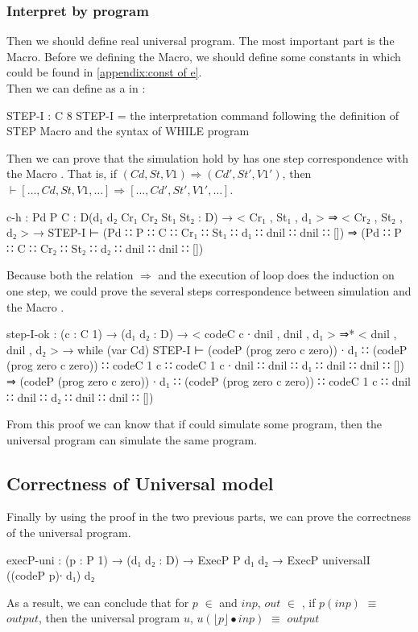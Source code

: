 \subsubsection{Interpret by \WHILE program}
Then we should define real universal \WHILE program.
The most important part is the  Macro.
Before we defining the Macro, we should define some constants in  which could be found in \ref{appendix:const of e}.\\
Then we can define  as a  in \Agda:
\begin{code}
STEP-I : C 8
STEP-I =  the interpretation command
	  following the definition of STEP Macro
	  and the syntax of WHILE program
\end{code}
Then we can prove that the simulation hold by \Agda has one step correspondence with the Macro .
That is, if $(Cd,St,V1)\Rightarrow(Cd',St',V1')$, then  $\vdash [\dots, Cd, St, V1, \dots] \Rightarrow [\dots, Cd', St', V1', \dots]$.
\begin{code}
  c-h : {Pd P C : D}(d₁ d₂ Cr₁ Cr₂ St₁ St₂ : D) 
        → < Cr₁ , St₁ , d₁ > ⇒ < Cr₂ , St₂ , d₂ >
        → STEP-I ⊢ (Pd ∷ P ∷ C ∷ Cr₁ ∷ St₁ ∷ d₁ ∷ dnil ∷ dnil ∷ [])
                 ⇒ (Pd ∷ P ∷ C ∷ Cr₂ ∷ St₂ ∷ d₂ ∷ dnil ∷ dnil ∷ [])
\end{code}
Because both the relation $\Rightarrow$ and the execution of  loop does the induction on one step, we could prove the several steps correspondence between \Agda simulation and the Macro .
\begin{code}[fontsize=\footnotesize]
step-I-ok : (c : C 1) → (d₁ d₂ : D) 
            → < codeC c ∙ dnil , dnil , d₁ > ⇒* < dnil , dnil , d₂ >
            → while (var Cd) STEP-I ⊢ (codeP (prog zero c zero)) ∙ d₁ ∷
                                      (codeP (prog zero c zero)) ∷
                                      codeC {1} c ∷ codeC {1} c ∙ dnil  ∷
                                      dnil ∷ d₁ ∷ dnil ∷ dnil ∷ [])
                                    ⇒ (codeP (prog zero c zero)) ∙ d₁ ∷
                                      (codeP (prog zero c zero)) ∷
                                      codeC {1} c ∷ dnil ∷ dnil ∷
                                      d₂ ∷ dnil ∷ dnil ∷ [])
\end{code}
From this proof we can know that if \Agda could simulate some \WHILE program, then the universal \WHILE program can simulate the same \WHILE program.
\subsection{Correctness of Universal \WHILE model}
Finally by using the proof in the two previous parts, we can prove the correctness of the universal \WHILE program.
\begin{code}
execP-uni :  (p : P 1) → (d₁ d₂ : D)
             → ExecP P d₁ d₂
             → ExecP universalI ((codeP p)∙ d₁) d₂
\end{code}
As a result, we can conclude that for $p$ $\in$  and $inp$, $out$ $\in$ , if $p(inp)$ $\equiv$ $output$, then the universal \WHILE program $u$, $u(\lfloor p \rfloor \bullet inp)$ $\equiv$ $output$

